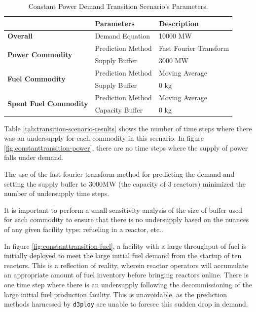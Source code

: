 \documentclass[11pt,letterpaper]{article}
\newcommand{\deploy}{\texttt{d3ploy}\xspace}%
\begin{document}
\begin{table}[!htbp]
	\centering
	\caption {Constant Power Demand Transition Scenario's Parameters.}
	\label{tab:transition-scenario-constant-power}
	\begin{tabular}{|l|l|p{}|}
		\hline
		& \textbf{Parameters}    & \textbf{Description} \\ \hline
		\textbf{Overall}& Demand Equation & 10000 MW \\ \hline
		\multirow{2}{*}{\textbf{Power Commodity}} & Prediction Method      &  Fast Fourier Transform\\ \cline{2-3} 
		& Supply Buffer          &  3000 MW \\ \hline
		\multirow{2}{*}{\textbf{Fuel Commodity}}  & Prediction Method      &  Moving Average\\ \cline{2-3}
		& Supply Buffer & 0 kg \\ \hline
		\multirow{2}{*}{\textbf{Spent Fuel Commodity}}  & Prediction Method      &  Moving Average\\ \cline{2-3}
		& Capacity Buffer & 0 kg \\ \hline
	\end{tabular}
\end{table}

Table \ref{tab:transition-scenario-results} shows the number of time 
steps where there was an undersupply for each commodity in this scenario. 
In figure \ref{fig:constanttransition-power}, there are no time steps
where the supply of power falls under demand.

The use of the fast fourier transform method for predicting the
demand and setting the supply buffer to 3000MW (the capacity of 3 reactors)
minimized the number of undersupply time steps.

It is important to perform a small sensitivity analysis of the size 
of buffer used for each commodity to ensure that there is no 
undersupply based on the nuances of any given facility type: 
refueling in a reactor, etc.. 

In figure \ref{fig:constanttransition-fuel},
a facility with a large throughput of fuel is initially
deployed to meet the large initial fuel demand from the startup of ten reactors. 
This is a reflection of reality, wherein reactor operators will 
accumulate an appropriate amount of fuel inventory before bringing reactors online. 
There is one time step where there is an undersupply following the 
decommissioning of the large initial fuel production facility.  
This is unavoidable, as the prediction methods harnessed by \deploy are unable 
to foresee this sudden drop in demand. 
\end{document}
